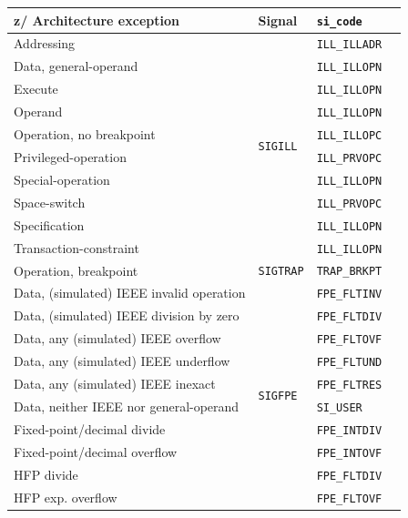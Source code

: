 \documentclass[USenglish,fontsize=11pt,twoside,%
  toc=bib,toc=idx,toc=graduated,numbers=noendperiod,
  bookmarks=true,
  bookmarksnumbered=true,
  bookmarksopen=true,
  bookmarksopenlevel=1,
  breaklinks=true,
  colorlinks=true,
  linkcolor=black,
  pdfpagelayout={TwoPageRight},
  pdfusetitle=true
]{scrreprt}
\newcommand{\ARCH}{z/\kern-1pt Ar\-chi\-tec\-ture}
\newcommand{\ARCH}{ESA/390}
\newenvironment{DIFnomarkup}{}{} %
\begin{document}
\begin{table}
  \centering
  \begin{DIFnomarkup}
  \begin{threeparttable}
    \begin{tabular}{llll}
      \toprule
      \ARCH{} exception
      & Signal & \texttt{si\_code} \\
      \midrule
      Addressing & \multirow{10}{*}{\texttt{SIGILL}} & \texttt{ILL\_ILLADR} \\
      Data, general-operand & & \texttt{ILL\_ILLOPN} \\
      Execute & & \texttt{ILL\_ILLOPN} \\
      Operand & & \texttt{ILL\_ILLOPN} \\
      Operation, no breakpoint\tnote{\dagger} & & \texttt{ILL\_ILLOPC} \\
      Privileged-operation & & \texttt{ILL\_PRVOPC} \\
      Special-operation & & \texttt{ILL\_ILLOPN} \\
      Space-switch & & \texttt{ILL\_PRVOPC} \\
      Specification & & \texttt{ILL\_ILLOPN} \\
      Transaction-constraint & & \texttt{ILL\_ILLOPN} \\
      \midrule
      Operation, breakpoint\tnote{\dagger} & \texttt{SIGTRAP}
               & \texttt{TRAP\_BRKPT} \\
      \midrule
      Data, (simulated) IEEE invalid operation
      & \multirow{18}{*}{\texttt{SIGFPE}} & \texttt{FPE\_FLTINV} \\
      Data, (simulated) IEEE division by zero & & \texttt{FPE\_FLTDIV} \\
      Data, any (simulated) IEEE overflow & & \texttt{FPE\_FLTOVF} \\
      Data, any (simulated) IEEE underflow & & \texttt{FPE\_FLTUND} \\
      Data, any (simulated) IEEE inexact\tnote{\ddagger} &
               & \texttt{FPE\_FLTRES} \\
      Data, neither IEEE nor general-operand & & \texttt{SI\_USER} \\
      Fixed-point/decimal divide & & \texttt{FPE\_INTDIV} \\
      Fixed-point/decimal overflow & & \texttt{FPE\_INTOVF} \\
      HFP divide & & \texttt{FPE\_FLTDIV} \\
      HFP exp\@. overflow & & \texttt{FPE\_FLTOVF} \\

\end{tabular}
\end{threeparttable}
\end{DIFnomarkup}
\end{table}
\end{document}
